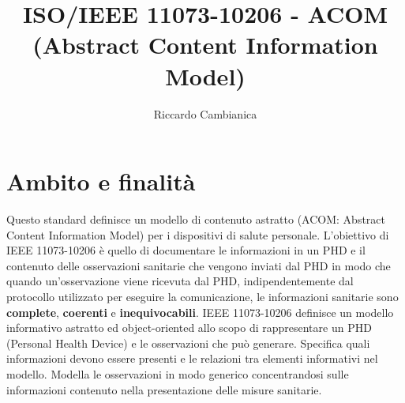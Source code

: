 \documentclass[a4paper]{article}
\title{ISO/IEEE 11073-10206 - ACOM (Abstract Content Information Model)}
\author{Riccardo Cambianica}
\begin{document}
    \maketitle
    \tableofcontents
    \newpage
    
    \section{Ambito e finalità}
        Questo standard definisce un modello di contenuto astratto (ACOM: Abstract Content Information Model) per i dispositivi di salute personale. 
        L'obiettivo di IEEE 11073-10206 è quello di documentare le informazioni in un PHD e il contenuto delle osservazioni sanitarie che vengono inviati dal
        PHD in modo che quando un'osservazione viene ricevuta dal PHD, indipendentemente dal protocollo utilizzato per eseguire
        la comunicazione, le informazioni sanitarie sono \textbf{complete}, \textbf{coerenti} e \textbf{inequivocabili}.
        IEEE 11073-10206 definisce un modello informativo astratto ed object-oriented allo scopo di rappresentare un PHD (Personal Health Device) e le osservazioni che può generare.
        Specifica quali informazioni devono essere presenti e le relazioni tra elementi informativi nel modello. Modella le osservazioni in modo generico
        concentrandosi sulle informazioni contenuto nella presentazione delle misure sanitarie.
    
\end{document}
